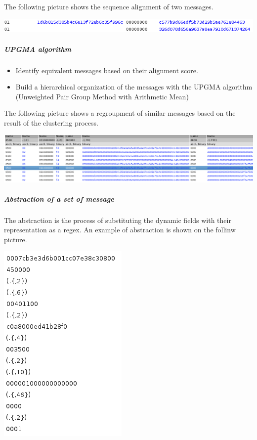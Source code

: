 \documentclass[letterpaper,10pt,english]{sphinxmanual}
\begin{document}
The following picture shows the sequence alignment of two messages.

\includegraphics{ExampleOfAligning.png}


\subparagraph{UPGMA algorithm}
\label{modelization/vocabular:upgma-algorithm}\begin{itemize}
\item {} 
Identify equivalent messages based on their alignment score.

\item {} 
Build a hierarchical organization of the messages with the UPGMA
algorithm (Unweighted Pair Group Method with Arithmetic Mean)

\end{itemize}

The following picture shows a regroupment of similar messages based on the result of the clustering process.

\includegraphics{ExampleOfMultipleAlignment.png}


\subparagraph{Abstraction of a set of message}
\label{modelization/vocabular:abstraction-of-a-set-of-message}
The abstraction is the process of substituting the dynamic fields with their representation as a regex. An example of abstraction is shown on the follinw picture.

\includegraphics{message_abstraction.png}
\end{document}
